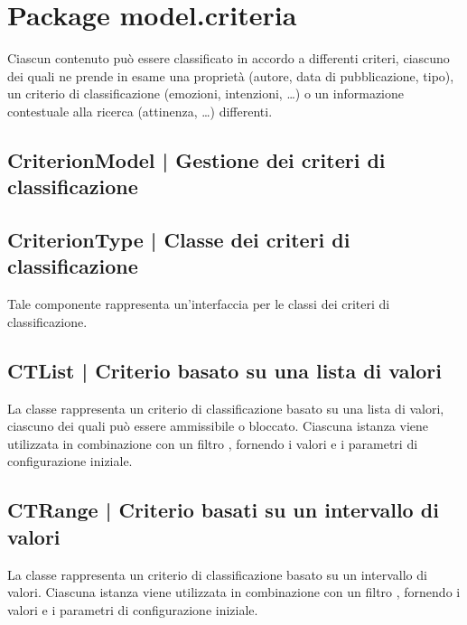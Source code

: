 \documentclass[10pt,a4paper,headinclude,footinclude,hidelinks]{scrreprt} %
\begin{document}
	\section{Package model.criteria}
	\label{sec:stage:design:sistema:model.criteria}
	Ciascun contenuto può essere classificato in accordo a differenti criteri, ciascuno dei quali ne prende in esame una proprietà (autore, data di pubblicazione, tipo), un criterio di classificazione (emozioni, intenzioni, \ldots) o un informazione contestuale alla ricerca (attinenza, \ldots) differenti.

	\subsection[CriterionModel]{CriterionModel | Gestione dei criteri di classificazione}
	\label{sec:stage:design:sistema:model.criteria:criteria-model}

	\subsection[CriterionType]{CriterionType | Classe dei criteri di classificazione}
	\label{sec:stage:design:sistema:model.criteria:criteria}
	Tale componente rappresenta un'interfaccia per le classi dei criteri di classificazione.

	\subsection[CTList]{CTList | Criterio basato su una lista di valori}
	\label{sec:stage:design:sistema:model.criteria:list-criterion}
	La classe \textit{} rappresenta un criterio di classificazione basato su una lista di valori, ciascuno dei quali può essere ammissibile o bloccato. Ciascuna istanza viene utilizzata in combinazione con un filtro \textit{}, fornendo i valori e i parametri di configurazione iniziale.

	\subsection[CTRange]{CTRange | Criterio basati su un intervallo di valori}
	\label{sec:stage:design:sistema:model.criteria:range-criterion}
	La classe \textit{} rappresenta un criterio di classificazione basato su un intervallo di valori. Ciascuna istanza viene utilizzata in combinazione con un filtro \textit{}, fornendo i valori e i parametri di configurazione iniziale.
\end{document}
